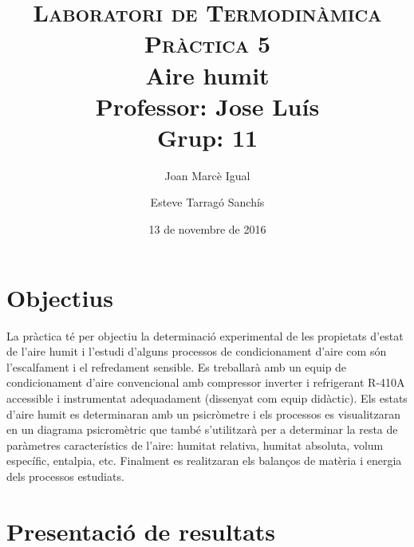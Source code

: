 \documentclass[a4paper]{article}
\title{
	\textsc{Laboratori de Termodinàmica} \\
	\textsc{Pràctica 5} \\
	Aire humit \\
	\large
	Professor: Jose Luís \\ Grup: 11 }
\author{Joan Marcè Igual \and Esteve Tarragó Sanchís}
\date{13 de novembre de 2016}
\begin{document}
\maketitle

\section{Objectius}

La pràctica té per objectiu la determinació experimental de les propietats d'estat de l'aire humit i l'estudi d'alguns processos de condicionament d'aire com són l'escalfament i el refredament sensible. Es treballarà amb un equip de condicionament d'aire convencional amb compressor inverter i refrigerant R-410A accessible i instrumentat adequadament (dissenyat com equip didàctic). Els estats d'aire humit es determinaran amb un psicròmetre i els processos es visualitzaran en un diagrama psicromètric que també s'utilitzarà per a determinar la resta de paràmetres característics de l'aire: humitat relativa, humitat absoluta, volum específic, entalpia, etc. Finalment es realitzaran els balanços de matèria i energia dels processos estudiats.

\section{Presentació de resultats}
\end{document}
